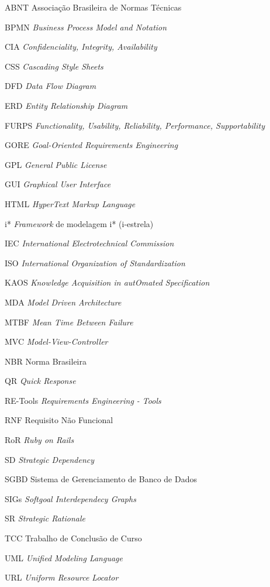 \begin{siglas}
  \item[ABNT] Associação Brasileira de Normas Técnicas
  \item[BPMN] \textit{Business Process Model and Notation}
  \item[CIA] \textit{Confidenciality, Integrity, Availability}
  \item[CSS] \textit{Cascading Style Sheets}
  \item[DFD] \textit{Data Flow Diagram}
  \item[ERD] \textit{Entity Relationship Diagram}
  \item[FURPS] \textit{Functionality, Usability, Reliability, Performance, Supportability}
  \item[GORE] \textit{Goal-Oriented Requirements Engineering}
  \item[GPL] \textit{General Public License}
  \item[GUI] \textit{Graphical User Interface}
  \item[HTML] \textit{HyperText Markup Language}	
  \item[i*] \textit{Framework} de modelagem i* (i-estrela)
  \item[IEC] \textit{International Electrotechnical Commission}
  \item[ISO] \textit{International Organization of Standardization}
  \item[KAOS] \textit{Knowledge Acquisition in autOmated Specification}
  \item[MDA] \textit{Model Driven Architecture}
  \item[MTBF] \textit{Mean Time Between Failure}
  \item[MVC] \textit{Model-View-Controller}
  \item[NBR] Norma Brasileira
  \item[QR] \textit{Quick Response}
  \item[RE-Tools] \textit{Requirements Engineering - Tools}
  \item[RNF] Requisito Não Funcional
  \item[RoR] \textit{Ruby on Rails}
  \item[SD] \textit{Strategic Dependency}
  \item[SGBD] Sistema de Gerenciamento de Banco de Dados
  \item[SIGs] \textit{Softgoal Interdependecy Graphs}
  \item[SR] \textit{Strategic Rationale}
  \item[TCC] Trabalho de Conclusão de Curso
  \item[UML] \textit{Unified Modeling Language}
  \item[URL] \textit{Uniform Resource Locator}
\end{siglas}
